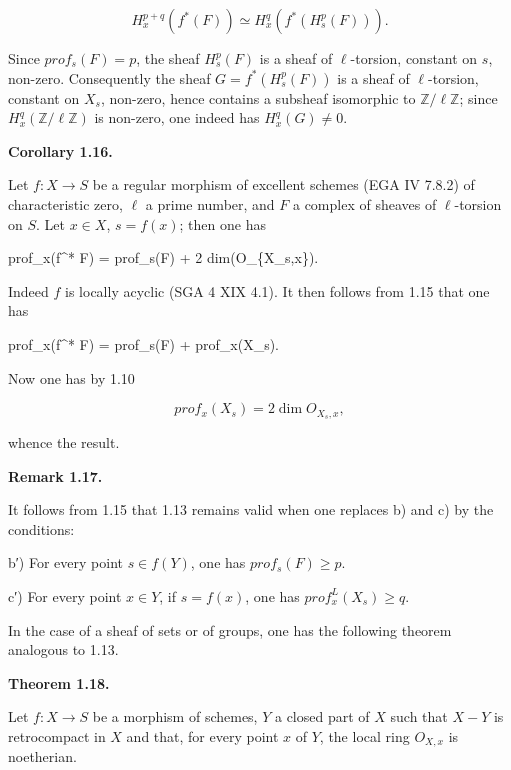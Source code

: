 \documentclass[
]{article}
\newenvironment{Shaded}{}{}
\newcommand{\NormalTok}[1]{#1}
\begin{document}
\[
H^{p+q}_{x}(f^{*}(F)) \simeq H^{q}_{x}(f^{*}(H^{p}_{s}(F))).
\]

Since \(prof_{s}(F) = p\), the sheaf \(H^{p}_{s}(F)\) is a sheaf of
\(\ell\)-torsion, constant on \(s\), non-zero. Consequently the sheaf
\(G = f^{*}(H^{p}_{s}(F))\) is a sheaf of \(\ell\)-torsion, constant on
\(X_{s}\), non-zero, hence contains a subsheaf isomorphic to
\(\mathbb{Z}/\ell \mathbb{Z}\); since
\(H^{q}_{x}(\mathbb{Z}/\ell \mathbb{Z})\) is non-zero, one indeed has
\(H^{q}_{x}(G) \neq 0\).

\textbf{Corollary 1.16.}

Let \(f : X \to S\) be a regular morphism of excellent schemes (EGA IV
7.8.2) of characteristic zero, \(\ell\) a prime number, and \(F\) a
complex of sheaves of \(\ell\)-torsion on \(S\). Let \(x \in X\),
\(s = f(x)\); then one has

\begin{Shaded}
\begin{Highlighting}[]
\NormalTok{prof\_x(f\^{}* F) = prof\_s(F) + 2 dim(O\_\{X\_s,x\}).}
\end{Highlighting}
\end{Shaded}

Indeed \(f\) is locally acyclic (SGA 4 XIX 4.1). It then follows from
1.15 that one has

\begin{Shaded}
\begin{Highlighting}[]
\NormalTok{prof\_x(f\^{}* F) = prof\_s(F) + prof\_x(X\_s).}
\end{Highlighting}
\end{Shaded}

Now one has by 1.10

\[
prof_{x}(X_{s}) = 2 \dim O_{X_{s},x},
\]

whence the result.

\textbf{Remark 1.17.}

It follows from 1.15 that 1.13 remains valid when one replaces b) and c)
by the conditions:

b′) For every point \(s \in f(Y)\), one has \(prof_{s}(F) \geqslant p\).

c′) For every point \(x \in Y\), if \(s = f(x)\), one has
\(prof^{L}_{x}(X_{s}) \geqslant q\).

In the case of a sheaf of sets or of groups, one has the following
theorem analogous to 1.13.

\textbf{Theorem 1.18.}

Let \(f : X \to S\) be a morphism of schemes, \(Y\) a closed part of
\(X\) such that \(X - Y\) is retrocompact in \(X\) and that, for every
point \(x\) of \(Y\), the local ring \(O_{X,x}\) is noetherian.
\end{document}
